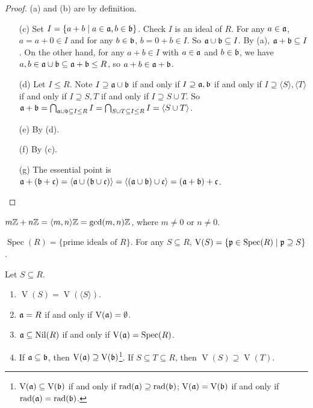 \begin{proof}
    (a) and (b) are by definition.
    \begin{enumerate}
        \item [(c)]
            Set $I = \{a+b \mid a \in \mathfrak{a},b \in \mathfrak{b}\}$. Check $I$ is an ideal of $R$. For any $a \in \mathfrak{a}$, $a = a + 0 \in I$ and for any $b \in \mathfrak{b}$, $b = 0 + b \in I$. So $\mathfrak{a} \cup \mathfrak{b} \subseteq I$. By (a), $\mathfrak{a} + \mathfrak{b} \subseteq I$. On the other hand, for any $a+b \in I$ with $a \in \mathfrak{a}$ and $b \in \mathfrak{b}$, we have $a,b \in \mathfrak{a} \cup \mathfrak{b} \subseteq \mathfrak{a} + \mathfrak{b} \leq R$, so $a + b \in \mathfrak{a} + \mathfrak{b}$.
        \item[(d)] Let $I \leq R$. Note $I \supseteq \mathfrak{a} \cup \mathfrak{b}$ if and only if $I \supseteq \mathfrak{a},\mathfrak{b}$ if and only if $I \supseteq \langle S \rangle, \langle T \rangle$ if and only if $I \supseteq S,T$ if and only if $I \supseteq S \cup T$. So $\mathfrak{a} + \mathfrak{b} = \bigcap_{\mathfrak{a} \cup \mathfrak{b} \subseteq I \leq R} I = \bigcap_{S \cup T \subseteq I \leq R} I = \langle S \cup T \rangle$.
        \item[(e)] By (d).
        \item[(f)] By (c).
        \item[(g)] The essential point is $\mathfrak{a} + (\mathfrak{b} + \mathfrak{c}) = \langle \mathfrak{a} \cup (\mathfrak{b} \cup \mathfrak{c}) \rangle = \langle (\mathfrak{a} \cup \mathfrak{b}) \cup \mathfrak{c} \rangle = (\mathfrak{a} + \mathfrak{b}) + \mathfrak{c}$. \qedhere
    \end{enumerate}
\end{proof}

\begin{example*}
    $m\mathbb{Z} + n\mathbb{Z} = \langle m,n \rangle\mathbb{Z} = \operatorname{gcd}(m,n)\mathbb{Z}$, where $m \neq 0$ or $n \neq 0$.
\end{example*}

\begin{recall*}
    $\operatorname{Spec}(R) = \{\text{prime ideals of $R$}\}$. For any $S \subseteq R$, $\operatorname{V}(S) = \{\mathfrak{p} \in \operatorname{Spec}(R) \mid \mathfrak{p} \supseteq S\}$.
\end{recall*}

\begin{proposition}
    Let $S \subseteq R$.
    \begin{enumerate}
        \item $\operatorname{V}(S) = \operatorname{V}(\langle S \rangle)$. 
        \item $\mathfrak{a} = R$ if and only if $\operatorname{V}(\mathfrak{a}) = \emptyset$.
        \item $\mathfrak{a} \subseteq \operatorname{Nil}(R)$ if and only if $\operatorname{V}(\mathfrak{a}) = \operatorname{Spec}(R)$.
        \item If $\mathfrak{a} \subseteq \mathfrak{b}$, then $\operatorname{V}(\mathfrak{a}) \supseteq \operatorname{V}(\mathfrak{b})$\footnote[2]{$\operatorname{V}(\mathfrak{a}) \subseteq \operatorname{V}(\mathfrak{b})$ if and only if $\operatorname{rad}(\mathfrak{a}) \supseteq \operatorname{rad}(\mathfrak{b})$; $\operatorname{V}(\mathfrak{a}) = \operatorname{V}(\mathfrak{b})$ if and only if $\operatorname{rad}(\mathfrak{a}) = \operatorname{rad}(\mathfrak{b})$.}. If $S \subseteq T \subseteq R$, then $\operatorname{V}(S) \supseteq \operatorname{V}(T)$.
    \end{enumerate}
\end{proposition}

